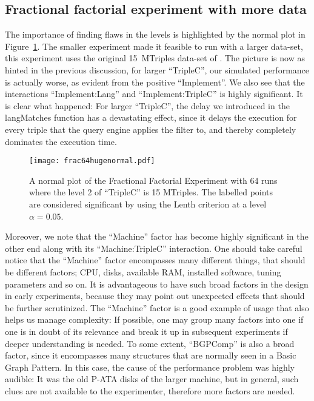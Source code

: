 \documentclass{llncs}
\begin{document}
\subsection{Fractional factorial experiment with more data}\label{sec:hugefrac}

The importance of finding flaws in the levels is highlighted by the
normal plot in Figure~\ref{fig:frac64hugenormal}. The smaller
experiment made it feasible to run with a larger data-set, this
experiment uses the original 15~MTriples data-set of
\cite{mxro:Morsey2011DBpedia}. The picture is now as hinted in the
previous discussion, for larger ``TripleC'', our simulated performance
is actually worse, as evident from the positive ``Implement''. We also
see that the interactions ``Implement:Lang'' and ``Implement:TripleC''
is highly significant. It is clear what happened: For larger
``TripleC'', the delay we introduced in the langMatches function has a
devastating effect, since it delays the execution for every triple
that the query engine applies the filter to, and thereby completely
dominates the execution time.

\begin{figure}[h!]
  \centerline{%
  \texttt{[image: frac64hugenormal.pdf]}}
  \caption{A normal plot of the Fractional Factorial Experiment with
    64 runs where the level 2 of ``TripleC'' is 15 MTriples. The
    labelled points are considered significant by using the Lenth
    criterion at a level $\alpha=0.05$.}\label{fig:frac64hugenormal}
\end{figure}


Moreover, we note that the ``Machine'' factor has become highly
significant in the other end along with its ``Machine:TripleC''
interaction. One should take careful notice that the ``Machine''
factor encompasses many different things, that should be different
factors; CPU, disks, available RAM, installed software, tuning
parameters and so on. It is advantageous to have such broad factors in
the design in early experiments, because they may point out unexpected
effects that should be further scrutinized. The ``Machine'' factor is
a good example of usage that also helps us manage complexity: If
possible, one may group many factors into one if one is in doubt of
its relevance and break it up in subsequent experiments if deeper
understanding is needed. To some extent, ``BGPComp'' is also a broad
factor, since it encompasses many structures that are normally seen in
a Basic Graph Pattern. In this case, the cause of the performance
problem was highly audible: It was the old P-ATA disks of the larger
machine, but in general, such clues are not available to the
experimenter, therefore more factors are needed.
\end{document}
